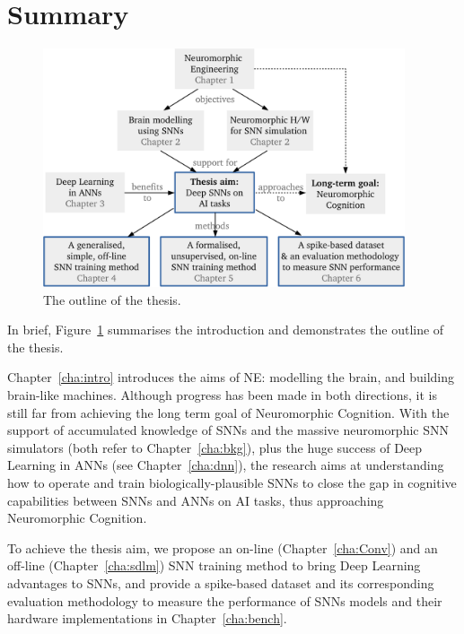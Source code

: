 \section{Summary}
	\begin{figure}[tbh!]
		\centering
		\includegraphics[width=0.95\textwidth]{pics_intro/intro_new.pdf}
		\caption{
			The outline of the thesis.
		}
		\label{fig:intro}
	\end{figure}
	
	In brief, Figure~\ref{fig:intro} summarises the introduction and demonstrates the outline of the thesis.
	
	Chapter~\ref{cha:intro} introduces the aims of NE: modelling the brain, and building brain-like machines.
	Although progress has been made in both directions, it is still far from achieving the long term goal of Neuromorphic Cognition.
	With the support of accumulated knowledge of SNNs and the massive neuromorphic SNN simulators (both refer to Chapter~\ref{cha:bkg}), plus the huge success of Deep Learning in ANNs (see Chapter~\ref{cha:dnn}), the research aims at understanding how to operate and train biologically-plausible SNNs to close the gap in cognitive capabilities between SNNs and ANNs on AI tasks, thus approaching Neuromorphic Cognition.
	
	To achieve the thesis aim, we propose an on-line (Chapter~\ref{cha:Conv}) and an off-line (Chapter~\ref{cha:sdlm}) SNN training method to bring Deep Learning advantages to SNNs, and provide a spike-based dataset and its corresponding evaluation methodology to measure the performance of SNNs models and their hardware implementations in Chapter~\ref{cha:bench}.
